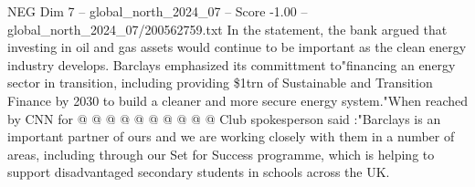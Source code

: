 \begin{textsample}{NEG Dim 7 – global\_north\_2024\_07 – Score -1.00 – global\_north\_2024\_07/200562759.txt}
In the statement, the bank argued that investing in oil and gas assets would continue to be important as the clean energy industry develops.
Barclays emphasized its committment to"financing an energy sector in transition, including providing \$1trn of Sustainable and Transition Finance by 2030 to build a cleaner and more secure energy system."When reached by CNN for @ @ @ @ @ @ @ @ @ @ Club spokesperson said :"Barclays is an important partner of ours and we are working closely with them in a number of areas, including through our Set for Success programme, which is helping to support disadvantaged secondary students in schools across the UK.

\end{textsample}
